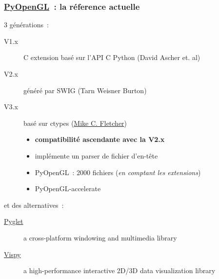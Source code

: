 \begin{frame}[fragile]
  \frametitle{\href{http://pyopengl.sourceforge.net}{PyOpenGL}~: la réference actuelle}
  3 générations~:
  \begin{description}
    \item[V1.x] C extension basé sur l'API C Python {\tiny (David Ascher et. al)}
    \item[V2.x] généré par SWIG {\tiny (Tarn Weisner Burton)}
    \item[V3.x] basé sur ctypes {\tiny (\href{http://www.vrplumber.com}{Mike C. Fletcher})}
      \begin{itemize}
      \item \textbf{compatibilité ascendante avec la V2.x}
      \item implémente un parser de fichier d'en-tête
      \item PyOpenGL~: 2000 fichiers \small({\emph{en comptant les extensions})}
      \item PyOpenGL-accelerate
      \end{itemize}
    \end{description}
    \vspace{1em}
    et des alternatives~:
    \begin{description}
    \item[\href{http://www.pyglet.org}{Pyglet}] a cross-platform windowing and multimedia library
    \item[\href{http://vispy.org}{Vispy}] a high-performance interactive 2D/3D data visualization library
    \end{description}
  \note{
    \begin{enumerate}
    \item
    \end{enumerate}
  }
\end{frame}

